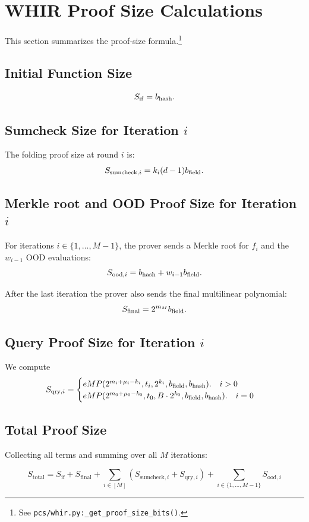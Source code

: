 \section{WHIR Proof Size Calculations}

This section summarizes the proof-size formula.\footnote{See \texttt{pcs/whir.py:\_get\_proof\_size\_bits()}.}

\subsection{Initial Function  Size}
\[
  S_{\mathrm{if}} = b_{\mathrm{hash}}.
\]

\subsection{Sumcheck Size for Iteration \texorpdfstring{\(i\)}{i}}


The folding proof size at round $i$ is:
\[
  S_{\mathrm{sumcheck},i} = k_i(d-1)b_{\mathrm{field}}.
\]

\subsection{Merkle root and OOD Proof Size for Iteration \texorpdfstring{\(i\)}{i}}

For iterations \(i\in\{1,\ldots,M-1\}\), the prover sends a Merkle root for $f_i$ and the $w_{i-1}$ OOD evaluations:
\[
  S_{\mathrm{ood},i}
    = b_{\mathrm{hash}}+w_{i-1}b_{\mathrm{field}}.
\]

After the last iteration the prover also sends the final multilinear polynomial:
$$
S_{\mathrm{final}}=2^{m_M}b_{\mathrm{field}}.
$$

\subsection{Query Proof Size for Iteration \texorpdfstring{\(i\)}{i}}


We compute
\[
  S_{\mathrm{qry},i}
    =\begin{cases}  eMP(2^{m_i+\mu_i-k_i},t_i,2^{k_i},b_{\mathrm{field}},b_{\mathrm{hash}}).\quad i>0\\
     eMP(2^{m_0+\mu_0-k_0},t_0, B\cdot 2^{k_0},b_{\mathrm{field}},b_{\mathrm{hash}}).\quad i=0
    \end{cases}
\]


\subsection{Total Proof Size}

Collecting all terms and summing over all \(M\) iterations:

\[
\boxed{
S_{\mathrm{total}}
  = S_{\mathrm{if}} + S_{\mathrm{final}}
    + \sum_{i\in[M]} \left( S_{\mathrm{sumcheck},i} + S_{\mathrm{qry},i} \right)
    + \sum_{i\in\{1,\ldots,M-1\}} S_{\mathrm{ood},i}
}
\]

